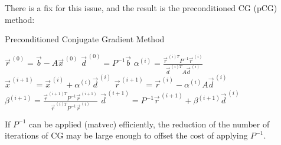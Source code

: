 There is a fix for this issue, and the result is the preconditioned CG (pCG) method:
%
\begin{algorithm}[H]
    \caption{Preconditioned Conjugate Gradient Method}
\begin{algorithmic}
    \STATE $\vec{r}^{\,(0)} =\vec{b}- A \vec{x}^{\,(0)}  $
    \STATE $\vec{d}^{\,(0)} = P^{-1}\vec{b}$
        \STATE $\alpha^{(i)}=\frac{\vec{r}^{\,(i)T}P^{-1}\vec{r}^{\,(i)}}
        {\vec{d}^{\,(i)T}A\vec{d}^{\,(i)}}$
        \STATE $\vec{x}^{\,(i+1)} = \vec{x}^{\,(i)} + \alpha^{(i)}\vec{d}^{\,(i)}$
        \STATE $\vec{r}^{\,(i+1)} = \vec{r}^{\,(i)} - \alpha^{(i)}A\vec{d}^{\,(i)}$
        \STATE $\beta^{(i+1)} = \frac{\vec{r}^{\,(i+1)T}P^{-1}\vec{r}^{\,(i+1)}} {\vec{r}^{\,(i)T}P^{-1}\vec{r}^{\,(i)}}$
        \STATE $\vec{d}^{\,(i+1)} = P^{-1}\vec{r}^{\,(i+1)} + \beta^{(i+1)}\vec{d}^{\,(i)}$
    \ENDFOR
\end{algorithmic}
\end{algorithm}

If $P^{-1}$ can be applied (matvec) efficiently, the reduction of the number of iterations of CG may be large enough to offset the cost of applying $P^{-1}$.

